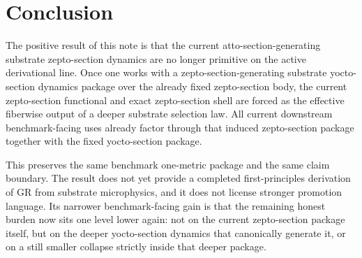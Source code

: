 \documentclass[11pt]{article}
\begin{document}
\section{Conclusion}

The positive result of this note is that the current atto-section-generating substrate zepto-section dynamics are no longer primitive on the active derivational line. Once one works with a zepto-section-generating substrate yocto-section dynamics package over the already fixed zepto-section body, the current zepto-section functional and exact zepto-section shell are forced as the effective fiberwise output of a deeper substrate selection law. All current downstream benchmark-facing uses already factor through that induced zepto-section package together with the fixed yocto-section package.

This preserves the same benchmark one-metric package and the same claim boundary. The result does not yet provide a completed first-principles derivation of GR from substrate microphysics, and it does not license stronger promotion language. Its narrower benchmark-facing gain is that the remaining honest burden now sits one level lower again: not on the current zepto-section package itself, but on the deeper yocto-section dynamics that canonically generate it, or on a still smaller collapse strictly inside that deeper package.
\end{document}
